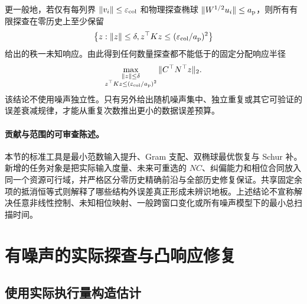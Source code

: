\documentclass[11pt,a4paper]{article}
\numberwithin{equation}{section}
\theoremstyle{definition}
\begin{document}
更一般地，若仅有每列界 $\|v_i\|\le\varepsilon_{\rm col}$ 和物理探查椭球 $\|W^{1/2}u_i\|\le a_{\rm p}$，则所有有限探查在零历史上至少保留
\begin{equation}
 \left\{z:\|z\|\le\delta,
      z^\top Kz\le(\varepsilon_{\rm col}/a_{\rm p})^2\right\}
\end{equation}
给出的秩一未知响应。由此得到任何数量探查都不能低于的固定分配响应半径
\begin{equation}
 \max_{\substack{\|z\|\le\delta\\
        z^\top Kz\le(\varepsilon_{\rm col}/a_{\rm p})^2}}
       \|C^\top N^\top z\|_2.
 \label{v44:eq:per-column-ellipsoid-floor}
\end{equation}
该结论不使用噪声独立性。只有另外给出随机噪声集中、独立重复或其它可验证的误差衰减规律，才能从重复次数推出更小的数据误差预算。

\paragraph{贡献与范围的可审查陈述。}
本节的标准工具是最小范数输入提升、Gram 支配、双椭球最优恢复与 Schur 补。新增的任务对象是把实际输入度量、未来可重选的 $NC$、纠偏能力和相位合同放入同一个资源可行域，并严格区分零历史精确前沿与全部历史修复保证。共享固定余项的抵消恒等式则解释了哪些结构外误差真正形成未辨识地板。上述结论不宣称解决任意非线性控制、未知相位映射、一般跨窗口变化或所有噪声模型下的最小总扫描时间。


\section{有噪声的实际探查与凸响应修复}
\label{sec:cal-noisy}

\subsection{使用实际执行量构造估计}
\end{document}
